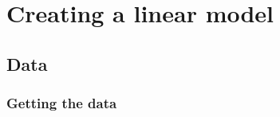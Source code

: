 \documentclass[10pt]{beamer}
\begin{document}
\section*{Creating a linear model}
\label{sec:orgcc624c0}

\subsection*{Data}
\label{sec:org0b3b10e}

\subsubsection*{Getting the data}
\label{sec:org6f5d1e1}
\end{document}
